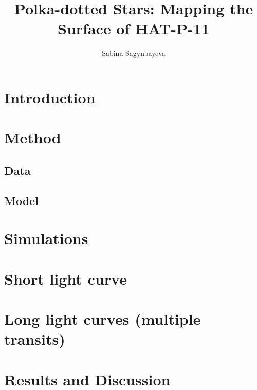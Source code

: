 \documentclass[twocolumn]{aastex631}
\begin{document}
\title{Polka-dotted Stars: Mapping the Surface of HAT-P-11}

\author{Sabina Sagynbayeva}

\begin{abstract}
   
\end{abstract}

\section{Introduction}
\label{sec:intro}

\section{Method}
\subsection{Data}
\subsection{Model}
\section{Simulations}
\section{Short light curve}
\section{Long light curves (multiple transits)}
\section{Results and Discussion}


\end{document}
